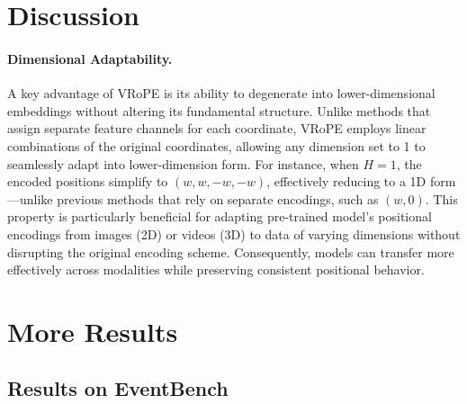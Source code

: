 \documentclass[11pt]{article}
\newcommand{\methodname}{VRoPE\xspace}
\begin{document}
%

\newpage
\appendix

\section{Discussion}
\label{sec:discussion}

\paragraph{Dimensional Adaptability.} A key advantage of \methodname is its ability to degenerate into lower-dimensional embeddings without altering its fundamental structure. Unlike methods that assign separate feature channels for each coordinate, \methodname employs linear combinations of the original coordinates, allowing any dimension set to 1 to seamlessly adapt into lower-dimension form. For instance, when $H = 1$, the encoded positions simplify to $(w, w, -w, -w)$, effectively reducing to a 1D form—unlike previous methods that rely on separate encodings, such as $(w, 0)$. This property is particularly beneficial for adapting pre-trained model's positional encodings from images (2D) or videos (3D) to data of varying dimensions without disrupting the original encoding scheme. Consequently, models can transfer more effectively across modalities while preserving consistent positional behavior.

\section{More Results}
\label{sec:more_results}

\subsection{Results on EventBench}
\end{document}
